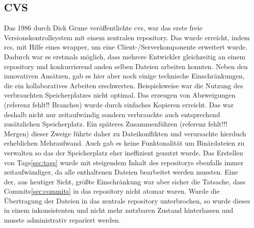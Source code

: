 \subsection{CVS}\label{sec:cvs}
Das 1986 durch Dick Grune veröffentlichte \acrfull{cvs}, war das erste freie
Versionskontrollsystem mit einem zentralen \gls{repository}. Das wurde
erreicht, indem \acrshort{rcs}, mit Hilfe eines \gls{wrapper}, um eine
Client-/Serverkomponente erweitert wurde. Dadurch war es erstmals möglich, dass
mehrere Entwickler gleichzeitig an einem \gls{repository} und konkurrierend
anden selben Dateien arbeiten konnten. Neben den innovativen Ansätzen, gab es
hier aber noch einige technische Einschränkungen, die ein kollaboratives
Arbeiten erschwerten. Beispielsweise war die Nutzung des verbrauchten
Speicherplatzes nicht optimal. Das erzeugen von Abzweigungen (referenz fehlt!!
Branches) wurde durch einfaches Kopieren erreicht. Das war deshalb nicht nur
zeitaufwändig sondern verbrauchte auch entsprechend zusätzlichen Speicherplatz.
Ein späteres Zusammenführen (referenz fehlt!!! Mergen) dieser Zweige führte
daher zu Dateikonflikten und verursachte hierduch erheblichen Mehraufwand. Auch
gab es keine Funktonalität um Binärdateien zu verwalten so das der
Speicherplatz eher ineffizient genutzt wurde. Das Erstellen von
Tags\ref{sec:tags} wurde mit steigendem Inhalt des \glspl{repository} ebenfalls
immer zeitaufwändiger, da alle enthaltenen Dateien bearbeitet werden mussten.
Eine der, aus heutiger Sicht, größte Einschränkung war aber sicher die
Tatsache, dass Commits\ref{sec:commits} in das \gls{repository} nicht atomar
waren. Wurde die Übertragung der Dateien in das zentrale \gls{repository}
unterbrochen, so wurde dieses in einem inkonsistenten und nicht mehr nutzbaren
Zustand hinterlassen und musste administrativ repariert
werden.\cite[S.~382-383]{cd}

